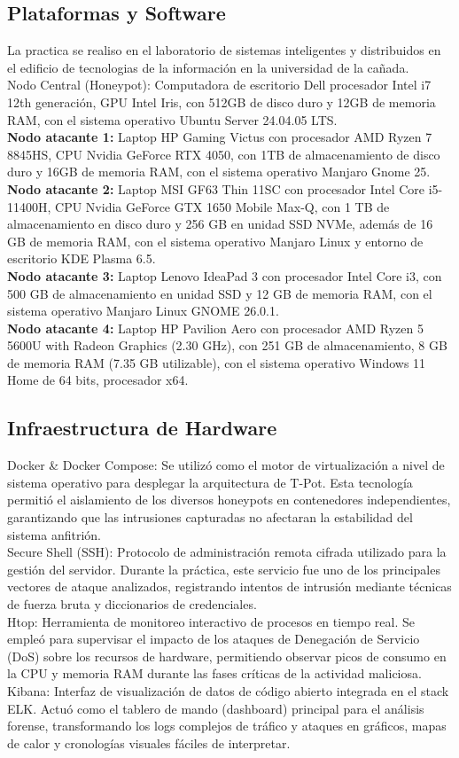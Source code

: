 \subsection{Plataformas y Software}
La practica se realiso en el laboratorio de sistemas inteligentes y distribuidos en el edificio de tecnologias de la información en la universidad de la cañada.\\
Nodo Central (Honeypot): Computadora de escritorio Dell procesador Intel i7 12th generación, GPU Intel Iris, con 512GB de disco duro y 12GB de memoria RAM, con el sistema operativo Ubuntu Server 24.04.05 LTS.\\
\textbf{Nodo atacante 1:} Laptop HP Gaming Victus con procesador AMD Ryzen 7 8845HS, CPU Nvidia GeForce RTX 4050, con 1TB de almacenamiento de disco duro y 16GB de memoria RAM, con el sistema operativo Manjaro Gnome 25.\\
\textbf{Nodo atacante 2:} Laptop MSI GF63 Thin 11SC con procesador Intel Core i5-11400H, CPU Nvidia GeForce GTX 1650 Mobile Max-Q, con 1 TB de almacenamiento en disco duro y 256 GB en unidad SSD NVMe, además de 16 GB de memoria RAM, con el sistema operativo Manjaro Linux y entorno de escritorio KDE Plasma 6.5.\\
\textbf{Nodo atacante 3:} Laptop Lenovo IdeaPad 3 con procesador Intel Core i3, con 500 GB de almacenamiento en unidad SSD y 12 GB de memoria RAM, con el sistema operativo Manjaro Linux GNOME 26.0.1.\\
\textbf{Nodo atacante 4:} Laptop HP Pavilion Aero con procesador AMD Ryzen 5 5600U with Radeon Graphics (2.30 GHz), con 251 GB de almacenamiento, 8 GB de memoria RAM (7.35 GB utilizable), con el sistema operativo Windows 11 Home de 64 bits, procesador x64.
\subsection{Infraestructura de Hardware}
Docker \& Docker Compose: Se utilizó como el motor de virtualización a nivel de sistema operativo para desplegar la arquitectura de T-Pot. Esta tecnología permitió el aislamiento de los diversos honeypots en contenedores independientes, garantizando que las intrusiones capturadas no afectaran la estabilidad del sistema anfitrión.\\
Secure Shell (SSH): Protocolo de administración remota cifrada utilizado para la gestión del servidor. Durante la práctica, este servicio fue uno de los principales vectores de ataque analizados, registrando intentos de intrusión mediante técnicas de fuerza bruta y diccionarios de credenciales.\\
Htop: Herramienta de monitoreo interactivo de procesos en tiempo real. Se empleó para supervisar el impacto de los ataques de Denegación de Servicio (DoS) sobre los recursos de hardware, permitiendo observar picos de consumo en la CPU y memoria RAM durante las fases críticas de la actividad maliciosa.\\
Kibana: Interfaz de visualización de datos de código abierto integrada en el stack ELK. Actuó como el tablero de mando (dashboard) principal para el análisis forense, transformando los logs complejos de tráfico y ataques en gráficos, mapas de calor y cronologías visuales fáciles de interpretar.

